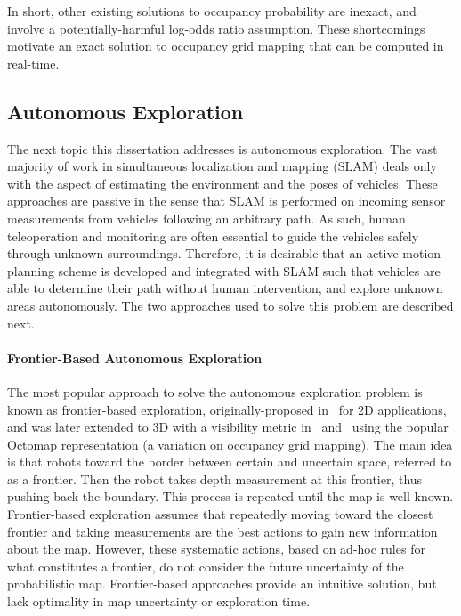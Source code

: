 \documentclass[thesis]{thesis-gwu}
\begin{document}
In short, other existing solutions to occupancy probability are inexact, and involve a potentially-harmful log-odds ratio assumption. These shortcomings motivate an exact solution to occupancy grid mapping that can be computed in real-time.




\subsection{Autonomous Exploration}

The next topic this dissertation addresses is autonomous exploration. The vast majority of work in simultaneous localization and mapping (SLAM) deals only with the aspect of estimating the environment and the poses of vehicles. These approaches are passive in the sense that SLAM is performed on incoming sensor measurements from vehicles following an arbitrary path. As such, human teleoperation and monitoring are often essential to guide the vehicles safely through unknown surroundings. Therefore, it is desirable that an active motion planning scheme is developed and integrated with SLAM such that vehicles are able to determine their path without human intervention, and explore unknown areas autonomously. The two approaches used to solve this problem are described next.

\paragraph{Frontier-Based Autonomous Exploration}

The most popular approach to solve the autonomous exploration problem is known as frontier-based exploration, originally-proposed in~\cite{Yam97,Yam98} for 2D applications, and was later extended to 3D with a visibility metric in~\cite{SawKriSri09} and~\cite{ZhuDinLinWu15,SenWan16,KleDor13} using the popular Octomap representation (a variation on occupancy grid mapping). The main idea is that robots toward the border between certain and uncertain space, referred to as a frontier. Then the robot takes depth measurement at this frontier, thus pushing back the boundary. This process is repeated until the map is well-known. Frontier-based exploration assumes that repeatedly moving toward the closest frontier and taking measurements are the best actions to gain new information about the map. However, these systematic actions, based on ad-hoc rules for what constitutes a frontier, do not consider the future uncertainty of the probabilistic map. Frontier-based approaches provide an intuitive solution, but lack optimality in map uncertainty or exploration time.
\end{document}
